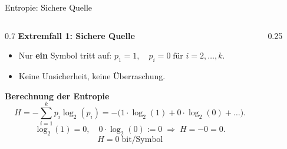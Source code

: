 \begin{frame}{Entropie: Sichere Quelle}
\begin{columns}
  \begin{column}{0.7\textwidth}
    \textbf{Extremfall 1: Sichere Quelle}
    \begin{itemize}
      \item Nur \textbf{ein} Symbol tritt auf: 
            \(
              p_1 = 1,\quad p_i = 0 \;\text{für } i = 2,\dots,k.
            \)
      \item Keine Unsicherheit, keine Überraschung.
    \end{itemize}
\medskip
    \textbf{Berechnung der Entropie}
    \[
      H = - \sum_{i=1}^{k} p_i \log_2(p_i)
         = - \bigl(1 \cdot \log_2(1) + 0 \cdot \log_2(0) + \dots \bigr).
    \]
    \[
      \log_2(1) = 0,\quad
      0 \cdot \log_2(0) := 0
      \;\Rightarrow\;
      H = -0 = 0.
    \]
    \[
      \boxed{H = 0 \;\text{bit/Symbol}}
    \]
  \end{column}

  \begin{column}{0.25\textwidth}
    \centering
{}
  \end{column}
\end{columns}
\end{frame}


